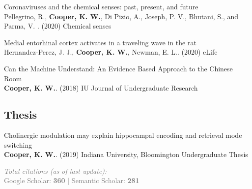 \documentclass[10pt]{cooperCV2}
\begin{document}
\begin{etaremune}[resume,itemindent=-1.5\bibhang, topsep=0pt,
				   itemsep=\bibsep,partopsep=0pt,parsep=0pt,leftmargin={\bibhang+\widthof{[999]}}]
	
    \item Coronaviruses and the chemical senses: past, present, and future \\
     Pellegrino, R., \textbf{Cooper, K. W.}, Di Pizio, A., Joseph, P. V., Bhutani, S., and Parma, V. . (2020) Chemical senses 
     
	
    \item Medial entorhinal cortex activates in a traveling wave in the rat \\
     Hernandez-Perez, J. J., \textbf{Cooper, K. W.}, Newman, E. L.. (2020) eLife 
     
	
    \item Can the Machine Understand: An Evidence Based Approach to the Chinese Room \\
     \textbf{Cooper, K. W.}. (2018) IU Journal of Undergraduate Research 
     
	

\end{etaremune}

 

	

\subsection{Thesis} 

\begin{etaremune}[resume,itemindent=-1.5\bibhang, topsep=0pt,
				   itemsep=\bibsep,partopsep=0pt,parsep=0pt,leftmargin={\bibhang+\widthof{[999]}}] 
    
    \item Cholinergic modulation may explain hippocampal encoding and retrieval mode switching \\
     \textbf{Cooper, K. W.}. (2019) Indiana University, Bloomington Undergraduate Thesis 
     
	

\end{etaremune}



\vspace{0.5cm}
\textcolor{grey}{
\textit{Total citations (as of last update):} \\
\textbf{\aiGoogleScholar} \hspace{0.05cm} Google Scholar: \textbf{360} | \textbf{\aiSemanticScholar} \hspace{0.05cm} Semantic Scholar: \textbf{281}\\
}
\end{document}
